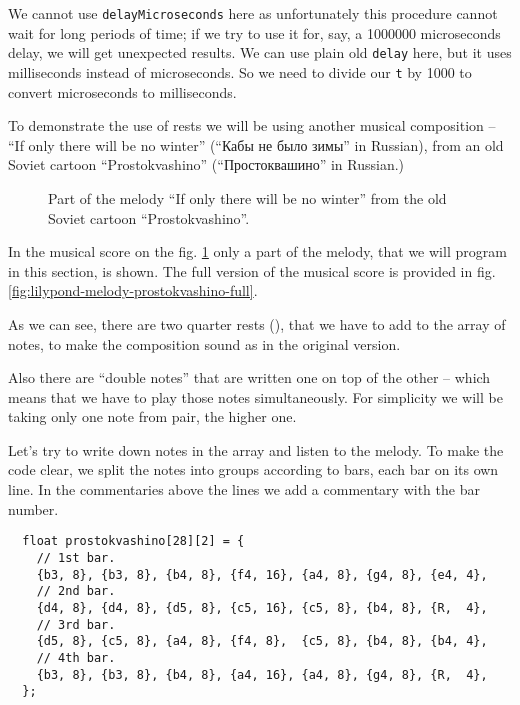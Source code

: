 \documentclass[../sparc.tex]{subfiles}
\begin{document}
We cannot use \texttt{delayMicroseconds} here as unfortunately this procedure
cannot wait for long periods of time; if we try to use it for, say, a 1000000
microseconds delay, we will get unexpected results.  We can use plain old
\texttt{delay} here, but it uses milliseconds instead of microseconds.  So we
need to divide our \texttt{t} by 1000 to convert microseconds to milliseconds.

To demonstrate the use of rests we will be using another musical composition --
``If only there will be no winter'' (``Кабы не было зимы'' in Russian), from an
old Soviet cartoon ``Prostokvashino'' (``Простоквашино'' in Russian.)

\begin{figure}[ht]
  \caption{Part of the melody ``If only there will be no winter'' from the old
    Soviet cartoon ``Prostokvashino''.}
  \label{fig:lilypond-melody-prostokvashino}
\end{figure}

In the musical score on the fig. \ref{fig:lilypond-melody-prostokvashino} only a
part of the melody, that we will program in this section, is shown.  The full
version of the musical score is provided in
fig. \ref{fig:lilypond-melody-prostokvashino-full}.

As we can see, there are two quarter rests (\crotchetRest), that we have to add
to the array of notes, to make the composition sound as in the original version.

Also there are ``double notes'' that are written one on top of the other -- which
means that we have to play those notes simultaneously.  For simplicity we will
be taking only one note from pair, the higher one.

Let's try to write down notes in the array and listen to the melody.  To make
the code clear, we split the notes into groups according to bars, each bar on
its own line.  In the commentaries above the lines we add a commentary with the
bar number.

\begin{verbatim}
  float prostokvashino[28][2] = {
    // 1st bar.
    {b3, 8}, {b3, 8}, {b4, 8}, {f4, 16}, {a4, 8}, {g4, 8}, {e4, 4},
    // 2nd bar.
    {d4, 8}, {d4, 8}, {d5, 8}, {c5, 16}, {c5, 8}, {b4, 8}, {R,  4},
    // 3rd bar.
    {d5, 8}, {c5, 8}, {a4, 8}, {f4, 8},  {c5, 8}, {b4, 8}, {b4, 4},
    // 4th bar.
    {b3, 8}, {b3, 8}, {b4, 8}, {a4, 16}, {a4, 8}, {g4, 8}, {R,  4},
  };
\end{verbatim}
\end{document}
